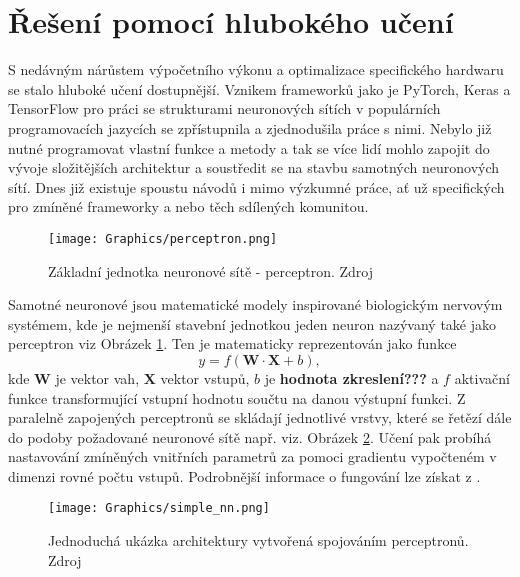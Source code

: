 \documentclass[czech, bc, kky, he, iso690numb]{fasthesis}
\begin{document}
        \section{Řešení pomocí hlubokého učení}
        	S nedávným nárůstem výpočetního výkonu a optimalizace specifického hardwaru se stalo hluboké učení dostupnější. Vznikem frameworků jako je PyTorch, Keras a TensorFlow pro práci se strukturami neuronových sítích v populárních programovacích jazycích se zpřístupnila a zjednodušila práce s nimi. Nebylo již nutné programovat vlastní funkce a metody a tak se více lidí mohlo zapojit do vývoje složitějších architektur a soustředit se na stavbu samotných neuronových sítí. Dnes již existuje spoustu návodů i mimo výzkumné práce, ať už specifických pro zmíněné frameworky a nebo těch sdílených komunitou.
            
	            \begin{figure}[h]
	            	\centering
	            	\texttt{[image: Graphics/perceptron.png]}
	            	\caption{Základní jednotka neuronové sítě - perceptron. Zdroj \cite{neural_networks_background_02}}
	            	\label{pic:perceptron}
	            \end{figure}
	            
            Samotné neuronové jsou matematické modely inspirované biologickým nervovým systémem, kde je nejmenší stavební jednotkou jeden neuron nazývaný také jako perceptron viz Obrázek \ref{pic:perceptron}. Ten je matematicky reprezentován jako funkce 
            \[y=f(\mathbf{W}\cdot\mathbf{X} + b),\]
            kde \(\mathbf{W}\) je vektor vah, \(\mathbf{X}\) vektor vstupů, \(b\) je \textbf{hodnota zkreslení???} a \(f\) aktivační funkce transformující vstupní hodnotu součtu na danou výstupní funkci. Z paralelně zapojených perceptronů se skládají jednotlivé vrstvy, které se řetězí dále do podoby požadované neuronové sítě např. viz. Obrázek \ref{pic:basic_nn}. Učení pak probíhá nastavování zmíněných vnitřních parametrů za pomoci gradientu vypočteném v dimenzi rovné počtu vstupů. Podrobnější informace o fungování lze získat z \cite{neural_networks_background_01,neural_networks_background_02}.
            
	            \begin{figure}[h]
	            	\centering
	            	\texttt{[image: Graphics/simple\_nn.png]}
	            	\caption{Jednoduchá ukázka architektury vytvořená spojováním perceptronů. Zdroj \cite{neural_networks_background_02}}
	            	\label{pic:basic_nn}
	            \end{figure}
            
\end{document}
